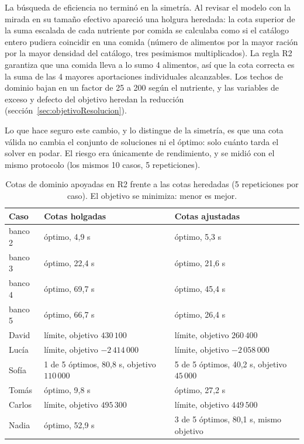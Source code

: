 La búsqueda de eficiencia no terminó en la simetría. Al revisar el modelo con la mirada en su tamaño efectivo apareció una holgura heredada: la cota superior de la suma escalada de cada nutriente por comida se calculaba como si el catálogo entero pudiera coincidir en una comida (número de alimentos por la mayor ración por la mayor densidad del catálogo, tres pesimismos multiplicados). La regla R2 garantiza que una comida lleva a lo sumo 4 alimentos, así que la cota correcta es la suma de las 4 mayores aportaciones individuales alcanzables. Los techos de dominio bajan en un factor de 25 a 200 según el nutriente, y las variables de exceso y defecto del objetivo heredan la reducción (sección~\ref{sec:objetivoResolucion}).

Lo que hace seguro este cambio, y lo distingue de la simetría, es que una cota válida no cambia el conjunto de soluciones ni el óptimo: solo cuánto tarda el solver en podar. El riesgo era únicamente de rendimiento, y se midió con el mismo protocolo (los mismos 10 casos, 5 repeticiones).

\begin{table}[htbp]
\centering
\small
\begin{tabular}{|p{1.5cm}|p{5.6cm}|p{5.6cm}|}
\hline
\textbf{Caso} & \textbf{Cotas holgadas} & \textbf{Cotas ajustadas} \\
\hline
banco 2 & óptimo, 4,9 s & óptimo, 5,3 s \\
\hline
banco 3 & óptimo, 22,4 s & óptimo, 21,6 s \\
\hline
banco 4 & óptimo, 69,7 s & óptimo, 45,4 s \\
\hline
banco 5 & óptimo, 66,7 s & óptimo, 26,4 s \\
\hline
David & límite, objetivo $430\,100$ & límite, objetivo $260\,400$ \\
\hline
Lucía & límite, objetivo $-2\,414\,000$ & límite, objetivo $-2\,058\,000$ \\
\hline
Sofía & 1 de 5 óptimos, 80,8 s, objetivo $110\,000$ & 5 de 5 óptimos, 40,2 s, objetivo $45\,000$ \\
\hline
Tomás & óptimo, 9,8 s & óptimo, 27,2 s \\
\hline
Carlos & límite, objetivo $495\,300$ & límite, objetivo $449\,500$ \\
\hline
Nadia & óptimo, 52,9 s & 3 de 5 óptimos, 80,1 s, mismo objetivo \\
\hline
\end{tabular}
\caption{Cotas de dominio apoyadas en R2 frente a las cotas heredadas (5 repeticiones por caso). El objetivo se minimiza: menor es mejor.}
\label{tab:cotas}
\end{table}

